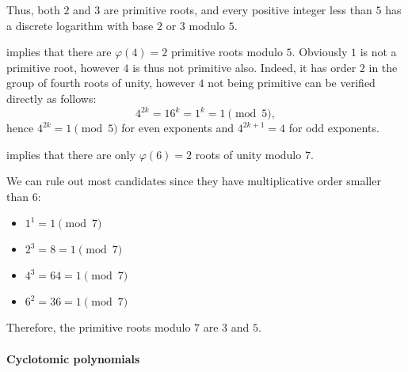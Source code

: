 \begin{example}
\begin{thmenum}
    Thus, both \( 2 \) and \( 3 \) are primitive roots, and every positive integer less than \( 5 \) has a discrete logarithm with base \( 2 \) or \( 3 \) modulo \( 5 \).

     implies that there are \( \varphi(4) = 2 \) primitive roots modulo \( 5 \). Obviously \( 1 \) is not a primitive root, however \( 4 \) is thus not primitive also. Indeed, it has order \( 2 \) in the group of fourth roots of unity, however \( 4 \) not being primitive can be verified directly as follows:
    \begin{equation*}
      4^{2k} = 16^k = 1^k = 1 \pmod 5,
    \end{equation*}
    hence \( 4^{2k} = 1 \pmod 5 \) for even exponents and \( 4^{2k + 1} = 4 \) for odd exponents.

      implies that there are only \( \varphi(6) = 2 \) roots of unity modulo \( 7 \).

    We can rule out most candidates since they have multiplicative order smaller than \( 6 \):
    \begin{itemize}
      \item \( 1^1 = 1 \pmod 7 \)
      \item \( 2^3 = 8 = 1 \pmod 7 \)
      \item \( 4^3 = 64 = 1 \pmod 7 \)
      \item \( 6^2 = 36 = 1 \pmod 7 \)
    \end{itemize}

    Therefore, the primitive roots modulo \( 7 \) are \( 3 \) and \( 5 \).
  \end{thmenum}
\end{example}

\paragraph{Cyclotomic polynomials}

